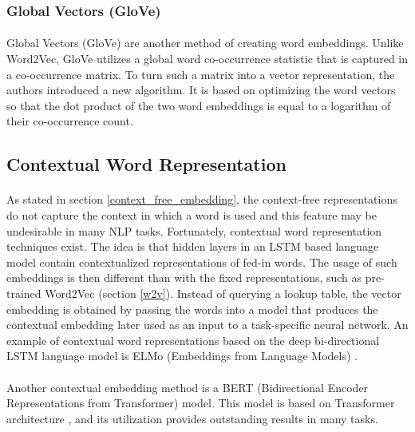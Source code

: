\subsubsection{Global Vectors (GloVe)}
\paragraph{}
Global Vectors (GloVe) \cite{glove} are another method of creating word embeddings. Unlike Word2Vec, GloVe utilizes a global word co-occurrence statistic that is captured in a co-occurrence matrix. To turn such a matrix into a vector representation, the authors introduced a new algorithm. It is based on optimizing the word vectors so that the dot product of the two word embeddings is equal to a logarithm of their co-occurrence count.

\subsection{Contextual Word Representation}
\paragraph{}
As stated in section \ref{context_free_embedding}, the context-free representations do not capture the context in which a word is used and this feature may be undesirable in many NLP tasks. Fortunately, contextual word representation techniques exist. The idea is that hidden layers in an LSTM based language model contain contextualized representations of fed-in words. The usage of such embeddings is then different than with the fixed representations, such as pre-trained Word2Vec (section \ref{w2v}). Instead of querying a lookup table, the vector embedding is obtained by passing the words into a model that produces the contextual embedding later used as an input to a task-specific neural network. An example of contextual word representations based on the deep bi-directional LSTM language model is ELMo (Embeddings from Language Models) \cite{elmo}.

\paragraph{}
Another contextual embedding method is a BERT \cite{bert} (Bidirectional Encoder Representations from Transformer) model. This model is based on Transformer architecture \cite{attention_is_all_you_need}, and its utilization provides outstanding results in many tasks.


